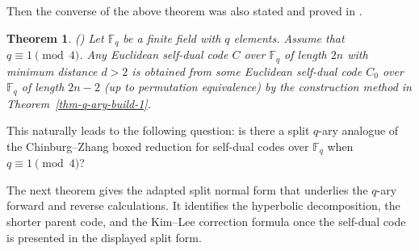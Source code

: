 \documentclass[12pt]{article}
\newtheorem{theorem}{Theorem}[section]
\begin{document}
 Then the converse of the above theorem was also stated and proved in \cite{KimLee}.

\begin{theorem}(\cite[Proposition 2.2]{KimLee}) \label{thm-q-ary-build-2}
Let $\mathbb F_q$ be a finite field with $q$ elements. Assume that $q \equiv 1 \pmod{4}$. Any Euclidean self-dual code $C$ over $\mathbb F_q$ of length $2n$ with minimum distance $d >2$ is obtained from some Euclidean self-dual code $C_0$ over $\mathbb F_q$ of length $2n-2$ (up to permutation equivalence) by the construction method in Theorem~\ref{thm-q-ary-build-1}.
\end{theorem}

This naturally leads to the following question: is there a split \(q\)-ary analogue of the Chinburg--Zhang boxed reduction for self-dual codes over \(\mathbb F_q\) when \(q\equiv 1 \pmod 4\)?

The next theorem gives the adapted split normal form that underlies the \(q\)-ary forward and reverse calculations. It identifies the hyperbolic decomposition, the shorter parent code, and the Kim--Lee correction formula once the self-dual code is presented in the displayed split form.
\end{document}
